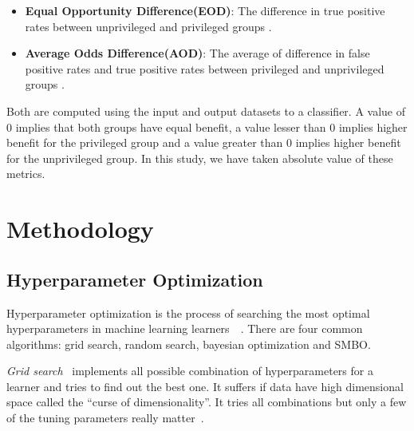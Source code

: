 \documentclass[10pt,conference]{IEEEtran}
\newcommand{\bi}{\begin{itemize}}
\newcommand{\ei}{\end{itemize}}
\begin{document}
\bi
\item \textbf{Equal Opportunity Difference(EOD)}: The difference in true positive rates between unprivileged and privileged groups \cite{IBM}. 
\item \textbf{Average Odds Difference(AOD)}: The average of difference in false positive rates and true positive rates between privileged and unprivileged groups \cite{IBM}.
\ei
Both are computed using the input and output datasets to a classifier. A value of 0 implies that both groups have equal benefit, a value lesser than 0 implies higher benefit for the privileged group and a value greater than 0 implies higher benefit for the unprivileged group. In this study, we have taken absolute value of these metrics. 

\section{Methodology}

\subsection{Hyperparameter Optimization}
 Hyperparameter optimization is the process of searching the most optimal hyperparameters in machine learning learners~\cite{biedenkapp2018hyperparameter}~\cite{franceschi2017forward}. There are four common algorithms: grid search, random search, bayesian optimization and SMBO.

\textit{Grid search}~\cite{bergstra2011algorithms} implements all possible combination of hyperparameters for a learner and tries to find out the best one. It suffers if data have high dimensional space called the ``curse of dimensionality''. It tries all combinations but only a few of the tuning parameters really matter~\cite{bergstra2012random}.
\end{document}
